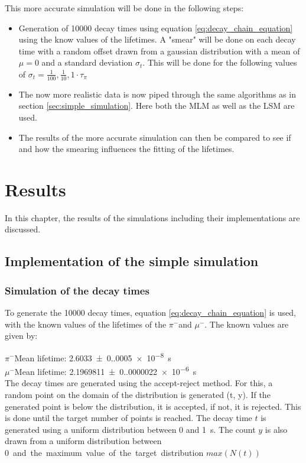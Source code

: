 \documentclass[11pt, a4paper, oneside]{book}
\newcommand{\pion}{$\pi^{-}$}
\newcommand{\muon}{$\mu^{-}$}
\begin{document}
This more accurate simulation will be done in the following steps:
\begin{itemize}
  \item Generation of \num{10000} decay times using equation \ref{eq:decay_chain_equation} using the know values of the lifetimes. A "smear" will be done on each decay time with a random offset drawn from a gaussian distribution with a mean of $\mu = 0$ and a standard deviation $\sigma_t$. This will be done for the following values of $\sigma_t = \frac{1}{100}, \frac{1}{10}, 1 \cdot \tau_\pi$
  \item The now more realistic data is now piped through the same algorithms as in section \ref{sec:simple_simulation}. Here both the MLM as well as the LSM are used.
  \item The results of the more accurate simulation can then be compared to see if and how the smearing influences the fitting of the lifetimes.
\end{itemize}


\chapter{Results}

In this chapter, the results of the simulations including their implementations are discussed.

\section{Implementation of the simple simulation} \label{sec:simple_simulation_results}

\subsection{Simulation of the decay times}
To generate the \num{10000} decay times, equation \ref{eq:decay_chain_equation} is used, with the known values of the lifetimes of the \pion and \muon. The known values are given by: \cite{ParticleDataGroup:2024cfk}

\pion Mean lifetime: \qty{2.6033(0.0005)e-8}{\s} \\
\muon Mean lifetime: \qty{2.1969811(0.0000022)e-6}{\s} \\

The decay times are generated using the accept-reject method. For this, a random point on the domain of the distribution is generated (t, y). If the generated point is below the distribution, it is accepted, if not, it is rejected. This is done until the target number of points is reached. 
The decay time $t$ is generated using a uniform distribution between 0 and \qty{1}{\s}. The count $y$ is also drawn from a uniform distribution between \qty{0} and the maximum value of the target distribution $max(N(t))$
\end{document}
